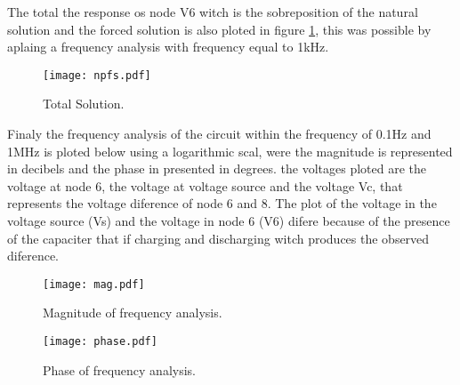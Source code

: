 The total the response os node V6 witch is the sobreposition of the natural solution and the forced solution is also ploted in figure \ref{Fig1:npfs}, this was possible by aplaing a frequency analysis with frequency equal to 1kHz.

\begin{figure}[H] \centering
\texttt{[image: npfs.pdf]}
\caption{Total Solution.}
\label{Fig1:npfs}
\end{figure}

Finaly the frequency analysis of the circuit within the frequency of 0.1Hz and 1MHz is ploted below using a logarithmic scal, were the magnitude is represented in decibels and the phase in presented in degrees. the voltages ploted are the voltage at node 6, the voltage at voltage source and the voltage Vc, that represents the voltage diference of node 6 and 8. The plot of the voltage in the voltage source (Vs) and the voltage in node 6 (V6) difere because of the presence of the capaciter that if charging and discharging witch produces the observed diference.

\begin{figure}[H] \centering
\texttt{[image: mag.pdf]}
\caption{Magnitude of frequency analysis.}
\label{Fig1:mag}
\end{figure}

\begin{figure}[H] \centering
\texttt{[image: phase.pdf]}
\caption{Phase of frequency analysis.}
\label{Fig1:phase}
\end{figure}
